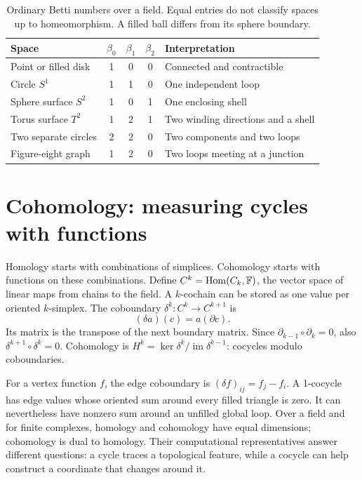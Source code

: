 \begin{table}[htbp]
\centering
\begin{tabular}{lcccl}
\toprule Space & $\beta_0$ & $\beta_1$ & $\beta_2$ & Interpretation\\\midrule
Point or filled disk & 1 & 0 & 0 & Connected and contractible\\
Circle $S^1$ & 1 & 1 & 0 & One independent loop\\
Sphere surface $S^2$ & 1 & 0 & 1 & One enclosing shell\\
Torus surface $T^2$ & 1 & 2 & 1 & Two winding directions and a shell\\
Two separate circles & 2 & 2 & 0 & Two components and two loops\\
Figure-eight graph & 1 & 2 & 0 & Two loops meeting at a junction\\\bottomrule
\end{tabular}
\caption{Ordinary Betti numbers over a field. Equal entries do not classify spaces up to homeomorphism. A filled ball differs from its sphere boundary.}
\end{table}

\section{Cohomology: measuring cycles with functions}
Homology starts with combinations of simplices. Cohomology starts with functions on these combinations. Define $C^k=\operatorname{Hom}(C_k,\mathbb{F})$, the vector space of linear maps from chains to the field. A $k$-cochain can be stored as one value per oriented $k$-simplex. The coboundary $\delta^k:C^k\to C^{k+1}$ is
\begin{equation}
(\delta a)(c)=a(\partial c).
\end{equation}
Its matrix is the transpose of the next boundary matrix. Since $\partial_{k-1}\circ\partial_k=0$, also $\delta^{k+1}\circ\delta^k=0$. Cohomology is $H^k=\ker\delta^k/\operatorname{im}\delta^{k-1}$: cocycles modulo coboundaries.

For a vertex function $f$, the edge coboundary is $(\delta f)_{ij}=f_j-f_i$. A 1-cocycle has edge values whose oriented sum around every filled triangle is zero. It can nevertheless have nonzero sum around an unfilled global loop. Over a field and for finite complexes, homology and cohomology have equal dimensions; cohomology is dual to homology. Their computational representatives answer different questions: a cycle traces a topological feature, while a cocycle can help construct a coordinate that changes around it.

